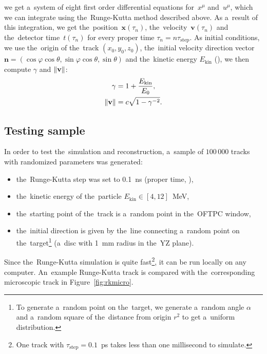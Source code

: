 		we get a~system of eight first order differential equations for~$x^\mu$ and~$u^\mu$, which we can integrate using the~Runge-Kutta method described above. As a~result of this integration, we get the~position~$\mathbf{x}(\tau_n)$, the~velocity~$\mathbf{v}(\tau_n)$ and the~detector time~$t(\tau_n)$ for every proper time $\tau_n = n \tau_\text{step}$.  As initial conditions, we use the~origin of the~track $(x_0,y_0,z_0)$, the~initial velocity direction vector $\mathbf{n} = (\cos\varphi\cos\theta,\sin\varphi\cos\theta,\sin\theta)$ and the~kinetic energy $E_\text{kin}$  (), we then compute $\gamma$ and $\norm{\mathbf{v}}$:
			\begin{align}
				\gamma &= 1 + \frac{E_\text{kin}}{E_0},\\
				\norm{\mathbf{v}} &= c\sqrt{1-\gamma^{-2}}.
			\end{align}
			
		\subsection{Testing sample}
		\label{sec:rktest}
		
		In order to test the~simulation and reconstruction, a~sample of $100\,000$ tracks with randomized parameters was generated:
			\begin{itemize}[topsep=4pt,itemsep=2pt]
				\item the~Runge-Kutta step was set to 0.1~ns (proper time, ),
				\item the~kinetic energy of the~particle $E_\text{kin} \in [4,12]$~MeV,
				\item the~starting point of the~track is a~random point in the~\ac{OFTPC} window,
				\item the~initial direction is given by the~line connecting a~random point on the~target\footnote{To generate a~random point on the~target, we generate a~random angle $\alpha$ and a~random square of the~distance from origin $r^2$ to get a~uniform distribution.} (a~disc with 1~mm radius in the~YZ plane).
			\end{itemize}
		Since the~Runge-Kutta simulation is quite fast\footnote{One track with $\tau_\text{step} = 0.1$~ps takes less than one millisecond to simulate.}, it can be run locally on any computer.  An~example Runge-Kutta track is compared with the~corresponding microscopic track in Figure~\ref{fig:rkmicro}.
		
